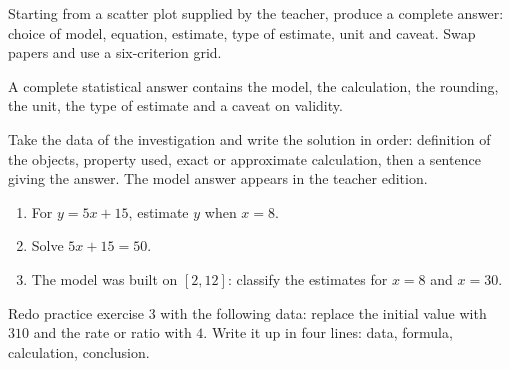 \begin{activite}
Starting from a scatter plot supplied by the teacher, produce a complete answer: choice of model, equation, estimate, type of estimate, unit and caveat. Swap papers and use a six-criterion grid.

\end{activite}

\begin{traceecrite}A complete statistical answer contains the model, the calculation, the rounding, the unit, the type of estimate and a caveat on validity.\end{traceecrite}

\begin{exemple}
Take the data of the investigation and write the solution in order: definition of the objects, property used, exact or approximate calculation, then a sentence giving the answer. The model answer appears in the teacher edition.
\end{exemple}

\begin{exercice}[-- essential]
\begin{enumerate}\item For $y=5x+15$, estimate $y$ when $x=8$.\item Solve $5x+15=50$.\item The model was built on $[2,12]$: classify the estimates for $x=8$ and $x=30$.\end{enumerate}
\end{exercice}


\begin{dm}Redo practice exercise 3 with the following data: replace the initial value with $310$ and the rate or ratio with $4$. Write it up in four lines: data, formula, calculation, conclusion.\end{dm}

